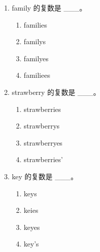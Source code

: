 \documentclass[11pt,a4paper]{ctexart}
\begin{document}
\begin{enumerate}[leftmargin=*,itemsep=4pt]
\item family 的复数是 \_\_\_。
\begin{enumerate}[label=\Alph*.,leftmargin=2em,itemsep=1pt,topsep=2pt]
\item families
\item familys
\item familyes
\item familiees
\end{enumerate}
\item strawberry 的复数是 \_\_\_。
\begin{enumerate}[label=\Alph*.,leftmargin=2em,itemsep=1pt,topsep=2pt]
\item strawberries
\item strawberrys
\item strawberryes
\item strawberries’
\end{enumerate}
\item key 的复数是 \_\_\_。
\begin{enumerate}[label=\Alph*.,leftmargin=2em,itemsep=1pt,topsep=2pt]
\item keys
\item keies
\item keyes
\item key’s
\end{enumerate}
\end{enumerate}
\end{document}
